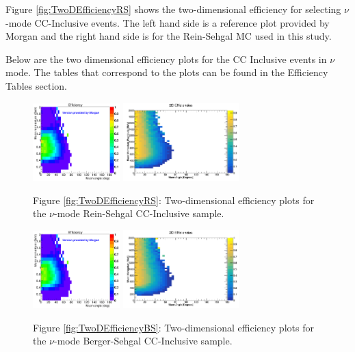\documentclass[11pt]{article}
\begin{document}
Figure \ref{fig:TwoDEfficiencyRS} shows the two-dimensional efficiency for selecting $\nu$-mode CC-Inclusive events. The left hand side is a reference plot provided by Morgan and the right hand side is for the Rein-Sehgal MC used in this study.

Below are the two dimensional efficiency plots for the CC Inclusive events in $\nu$ mode. The tables that correspond to the plots can be found in the Efficiency Tables section.

\begin{figure}[H]
\centering
\includegraphics[width=0.3\textwidth]{CCInclusivePlots/MorgansCCInclusiveSample.png}
\includegraphics[width=0.4\textwidth]{CCInclusivePlots/2DEffCompareNMRS.png}
\caption*{Figure \ref*{fig:TwoDEfficiencyRS}: Two-dimensional efficiency plots for the $\nu$-mode Rein-Sehgal CC-Inclusive sample.}
\end{figure}\label{fig:TwoDEfficiencyRS}

\begin{figure}[H]
\centering
\includegraphics[width=0.3\textwidth]{CCInclusivePlots/MorgansCCInclusiveSample.png}
\includegraphics[width=0.4\textwidth]{CCInclusivePlots/2DEffCompareNMBS.png}
\caption*{Figure \ref*{fig:TwoDEfficiencyBS}: Two-dimensional efficiency plots for the $\nu$-mode Berger-Sehgal CC-Inclusive sample.}
\end{figure}\label{fig:TwoDEfficiencyBS}
\end{document}
